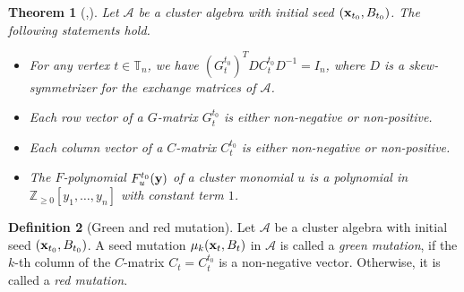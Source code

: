 \documentclass[10pt]{amsart}
\newtheorem{theorem}{Theorem}[section]
\theoremstyle{definition}
\newtheorem{definition}[theorem]{Definition}
\theoremstyle{remark}
\numberwithin{equation}{section}
\begin{document}
\begin{theorem}[{\cite{GHKK18},\cite{NZ12}}] \label{thm:GHKK}
Let $\mathcal A$ be a cluster algebra with initial seed $({\bf x}_{t_0}, B_{t_0})$. The following statements hold.
\begin{itemize}
    \item [(i)] For any vertex $t\in \mathbb{T}_n$, we have $(G_t^{t_0})^TDC_t^{t_0}D^{-1}=I_n$, where $D$ is a skew-symmetrizer for the exchange matrices of $\mathcal A$.
    \item[(ii)]  Each row vector of a $G$-matrix $G_t^{t_0}$ is either non-negative or non-positive.
    \item [(iii)] Each column vector of a $C$-matrix $C_t^{t_0}$ is either non-negative or non-positive.
\item[(iv)] The $F$-polynomial
$F_{u}^{t_0}({\bf y})$ of a cluster monomial $u$ is a polynomial in $\mathbb Z_{\geq 0}[y_1,\ldots,y_n]$ with constant term $1$.
\end{itemize}
\end{theorem}

\begin{definition}[Green and red mutation] 
Let $\mathcal A$ be a cluster algebra with initial seed $({\bf x}_{t_0}, B_{t_0})$. A seed mutation $\mu_k({\bf x}_t, B_t)$ in $\mathcal A$ is called a {\em green mutation}, if the $k$-th column of the $C$-matrix $C_t=C_t^{t_0}$ is a non-negative vector. Otherwise, it is called a {\em red mutation}.
\end{definition}
\end{document}
